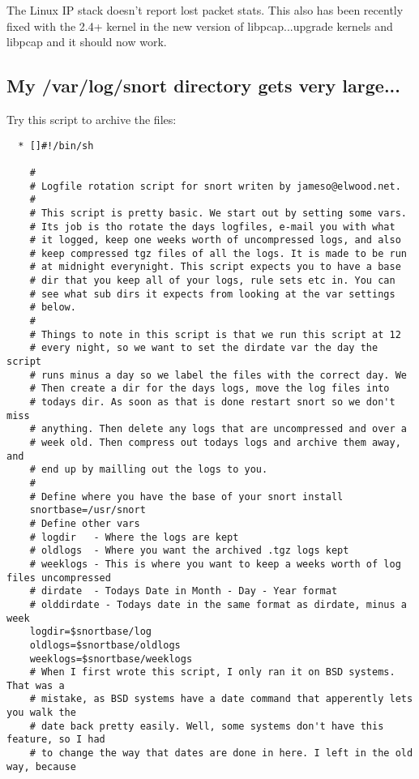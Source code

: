 \documentclass{article}
\begin{document}
The Linux IP stack doesn't report lost packet stats. This also has been
recently fixed with the 2.4+ kernel in the new version of libpcap...upgrade
kernels and libpcap and it should now work.

\subsection{My /var/log/snort directory gets very large...}

Try this script to archive the files:

\begin{verbatim}
  * []#!/bin/sh

    # 
    # Logfile rotation script for snort writen by jameso@elwood.net.
    # 
    # This script is pretty basic. We start out by setting some vars.
    # Its job is tho rotate the days logfiles, e-mail you with what 
    # it logged, keep one weeks worth of uncompressed logs, and also
    # keep compressed tgz files of all the logs. It is made to be run
    # at midnight everynight. This script expects you to have a base
    # dir that you keep all of your logs, rule sets etc in. You can 
    # see what sub dirs it expects from looking at the var settings
    # below.
    # 
    # Things to note in this script is that we run this script at 12 
    # every night, so we want to set the dirdate var the day the script
    # runs minus a day so we label the files with the correct day. We
    # Then create a dir for the days logs, move the log files into 
    # todays dir. As soon as that is done restart snort so we don't miss
    # anything. Then delete any logs that are uncompressed and over a
    # week old. Then compress out todays logs and archive them away, and
    # end up by mailling out the logs to you.
    #
    # Define where you have the base of your snort install
    snortbase=/usr/snort
    # Define other vars
    # logdir   - Where the logs are kept
    # oldlogs  - Where you want the archived .tgz logs kept
    # weeklogs - This is where you want to keep a weeks worth of log files uncompressed
    # dirdate  - Todays Date in Month - Day - Year format
    # olddirdate - Todays date in the same format as dirdate, minus a week
    logdir=$snortbase/log
    oldlogs=$snortbase/oldlogs
    weeklogs=$snortbase/weeklogs
    # When I first wrote this script, I only ran it on BSD systems. That was a
    # mistake, as BSD systems have a date command that apperently lets you walk the
    # date back pretty easily. Well, some systems don't have this feature, so I had
    # to change the way that dates are done in here. I left in the old way, because

\end{verbatim}
\end{document}
